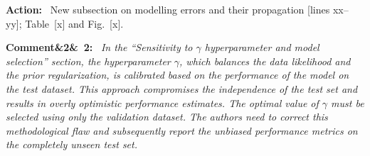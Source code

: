 \documentclass[11pt]{article}
\newenvironment{rcomment}[1]{\par\bigskip\noindent\textbf{Comment\ifx&#1&\else\ #1\fi:}\ \itshape}{\par}
\newenvironment{action}{\par\smallskip\noindent\color{resp}\textbf{Action:}\ }{\par}
\newcommand{\tbd}[1]{\textcolor{note}{\textsf{[#1]}}}
\newcommand{\lines}[1]{\tbd{lines #1}}
\begin{document}
\begin{action}
New subsection on modelling errors and their propagation \lines{xx--yy}; Table~\tbd{x} and Fig.~\tbd{x}.
\end{action}

\begin{rcomment}{2}
In the ``Sensitivity to $\gamma$ hyperparameter and model selection'' section, the hyperparameter $\gamma$, which
balances the data likelihood and the prior regularization, is calibrated based on the performance of the model on the
test dataset. This approach compromises the independence of the test set and results in overly optimistic performance
estimates. The optimal value of $\gamma$ must be selected using only the validation dataset. The authors need to
correct this methodological flaw and subsequently report the unbiased performance metrics on the completely unseen test
set.
\end{rcomment}
\end{document}
